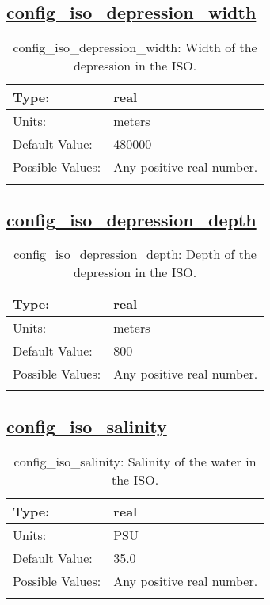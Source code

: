 \subsection[config\_iso\_depression\_width]{\hyperref[sec:nm_tab_iso]{config\_iso\_depression\_width}}
\label{subsec:nm_sec_config_iso_depression_width}
\begin{center}
\begin{longtable}{| p{2.0in} || p{4.0in} |}
    \hline
    Type: & real \\
    \hline
    Units: & \si{meters} \\
    \hline
    Default Value: & 480000 \\
    \hline
    Possible Values: & Any positive real number. \\
    \hline
    \caption{config\_iso\_depression\_width: Width of the depression in the ISO.}
\end{longtable}
\end{center}
\subsection[config\_iso\_depression\_depth]{\hyperref[sec:nm_tab_iso]{config\_iso\_depression\_depth}}
\label{subsec:nm_sec_config_iso_depression_depth}
\begin{center}
\begin{longtable}{| p{2.0in} || p{4.0in} |}
    \hline
    Type: & real \\
    \hline
    Units: & \si{meters} \\
    \hline
    Default Value: & 800 \\
    \hline
    Possible Values: & Any positive real number. \\
    \hline
    \caption{config\_iso\_depression\_depth: Depth of the depression in the ISO.}
\end{longtable}
\end{center}
\subsection[config\_iso\_salinity]{\hyperref[sec:nm_tab_iso]{config\_iso\_salinity}}
\label{subsec:nm_sec_config_iso_salinity}
\begin{center}
\begin{longtable}{| p{2.0in} || p{4.0in} |}
    \hline
    Type: & real \\
    \hline
    Units: & \si{PSU} \\
    \hline
    Default Value: & 35.0 \\
    \hline
    Possible Values: & Any positive real number. \\
    \hline
    \caption{config\_iso\_salinity: Salinity of the water in the ISO.}
\end{longtable}
\end{center}

